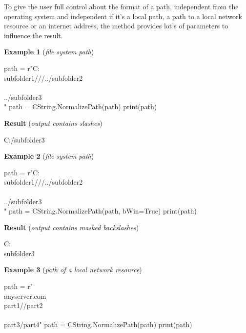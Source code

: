 To give the user full control about the format of a path, independent from the operating system and independent if it's
a local path, a path to a local network resource or an internet address, the method  provides
lot's of parameters to influence the result.

\vspace{1ex}

\textbf{Example 1} (\textit{file system path})

\begin{pythoncode}
path = r"C:\\subfolder1///../subfolder2\\\\../subfolder3\\"
path = CString.NormalizePath(path)
print(path)
\end{pythoncode}

\textbf{Result} (\textit{output contains slashes})

\begin{pythonlog}
C:/subfolder3
\end{pythonlog}

\vspace{1ex}

\textbf{Example 2} (\textit{file system path})

\begin{pythoncode}
path = r"C:\\subfolder1///../subfolder2\\\\../subfolder3\\"
path = CString.NormalizePath(path, bWin=True)
print(path)
\end{pythoncode}

\textbf{Result} (\textit{output contains masked backslashes})

\begin{pythonlog}
C:\\subfolder3
\end{pythonlog}

\vspace{1ex}

\textbf{Example 3} (\textit{path of a local network resource})

\begin{pythoncode}
path = r"\\anyserver.com\\part1//part2\\\\part3/part4"
path = CString.NormalizePath(path)
print(path)
\end{pythoncode}

